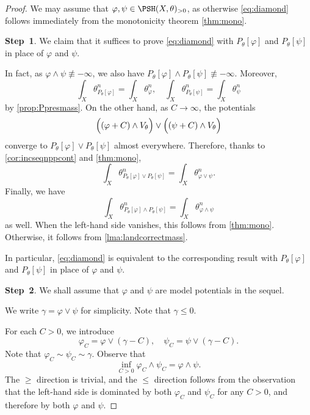 \begin{proof}
    We may assume that $\varphi,\psi\in \PSH(X,\theta)_{>0}$, as otherwise \eqref{eq:diamond} follows immediately from the monotonicity theorem \cref{thm:mono}.

    \textbf{Step~1}. We claim that it suffices to prove \eqref{eq:diamond} with $P_{\theta}[\varphi]$ and $P_{\theta}[\psi]$ in place of $\varphi$ and $\psi$.

    In fact, as $\varphi\land \psi\not \equiv -\infty$, we also have $P_{\theta}[\varphi]\land P_{\theta}[\psi]\not\equiv -\infty$. Moreover,
    \[
    \int_X \theta_{P_{\theta}[\varphi]}^n=\int_X \theta_{\varphi}^n,\quad \int_X \theta_{P_{\theta}[\psi]}^n=\int_X \theta_{\psi}^n
    \]
    by \cref{prop:Ppresmass}. On the other hand, as $C\to \infty$, the potentials
    \[
        \Bigl( (\varphi+C)\land V_{\theta} \Bigr) \lor \Bigl( (\psi+C)\land V_{\theta} \Bigr)
    \]
    converge to $P_{\theta}[\varphi]\lor P_{\theta}[\psi]$ almost everywhere. Therefore, thanks to \cref{cor:incseqnppcont} and \cref{thm:mono},
    \[
    \int_X \theta_{P_{\theta}[\varphi]\lor P_{\theta}[\psi]}^n=\int_X \theta_{\varphi\lor \psi}^n.
    \]
    Finally, we have
    \[
    \int_X \theta_{P_{\theta}[\varphi]\land P_{\theta}[\psi]}^n= \int_X \theta_{\varphi\land\psi}^n
    \]
    as well. When the left-hand side vanishes, this follows from \cref{thm:mono}. Otherwise, it follows from \cref{lma:landcorrectmass}.

    In particular, \eqref{eq:diamond} is equivalent to the corresponding result with $P_{\theta}[\varphi]$ and $P_{\theta}[\psi]$ in place of $\varphi$ and $\psi$.

    \textbf{Step~2}. We shall assume that $\varphi$ and $\psi$ are model potentials in the sequel.

    We write $\gamma=\varphi\lor \psi$ for simplicity. Note that $\gamma\leq 0$.

    For each $C>0$, we introduce
    \[
    \varphi_C=\varphi\lor (\gamma-C),\quad \psi_C=\psi\lor (\gamma-C).
    \]
    Note that $\varphi_C\sim \psi_C\sim \gamma$. Observe that \[
        \inf_{C>0} \varphi_C\land \psi_C=\varphi\land\psi.
    \]
    The $\geq$ direction is trivial, and the $\leq$ direction follows from the observation that the left-hand side is dominated by both $\varphi_C$ and $\psi_C$ for any $C>0$, and therefore by both $\varphi$ and $\psi$.


\end{proof}
